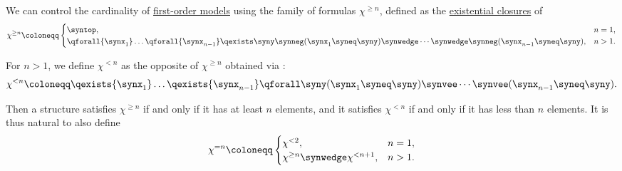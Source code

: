\begin{proposition}\label{thm:cardinality_control_formulas}
  We can control the cardinality of \hyperref[def:fol_semantics/model]{first-order models} using the family of formulas \( \chi^{\geq n} \), defined as the \hyperref[def:fol_quantifier_closure]{existential closures} of
  \begin{equation*}
    \chi^{\geq n} \coloneqq \begin{cases}
      \syntop,                                                                                                                                                      &n = 1, \\
      \qforall {\synx_1} \ldots \qforall {\synx_{n-1}} \qexists \syny \synneg (\synx_1 \syneq \syny) \synwedge \cdots \synwedge \synneg (\synx_{n-1} \syneq \syny), &n > 1.
    \end{cases}
  \end{equation*}

  For \( n > 1 \), we define \( \chi^{< n} \) as the opposite of \( \chi^{\geq n} \) obtained via :
  \begin{equation*}
    \chi^{< n} \coloneqq \qexists {\synx_1} \ldots \qexists {\synx_{n-1}} \qforall \syny (\synx_1 \syneq \syny) \synvee \cdots \synvee (\synx_{n-1} \syneq \syny).
  \end{equation*}

  Then a structure satisfies \( \chi^{\geq n} \) if and only if it has at least \( n \) elements, and it satisfies \( \chi^{< n} \) if and only if it has less than \( n \) elements. It is thus natural to also define
  \begin{equation*}
    \chi^{=n} \coloneqq \begin{cases}
      \chi^{<2},                           &n = 1, \\
      \chi^{\geq n} \synwedge \chi^{<n+1}, &n > 1.
    \end{cases}
  \end{equation*}
\end{proposition}
